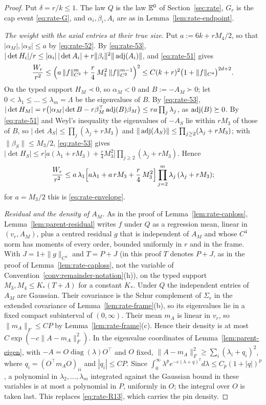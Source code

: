 \begin{proof}
Put $\delta=r/k\le1$. The law $Q$ is the law $\mathbb E^0$ of Section~\ref{sec:rate}, $G_r$ is the cap event \eqref{eq:rate-G}, and $\alpha_i,\beta_i,A_i$ are as in Lemma~\ref{lem:rate-endpoint}.

\emph{The weight with the axial entries at their true size.} Put $a:=6k+rM_4/2$, so that $|\alpha_M|,|\alpha_S|\le a$ by \eqref{eq:rate-52}. By \eqref{eq:rate-53}, $|\det H_i|/r\le|\alpha_i|\,|\det A_i|+r\|\beta_i\|^2\|\operatorname{adj}(A_i)\|$, and \eqref{eq:rate-51} gives
\begin{equation}\label{eq:remainder-capW}
\frac{W_r}{r^2}\le\Bigl(a\,\|f\|_{C^2}^m+\frac r4\,M_3^2\,\|f\|_{C^2}^{m-1}\Bigr)^2\le C(k+r)^2\bigl(1+\|f\|_{C^4}\bigr)^{2d+2}.
\end{equation}
On the typed support $H_M\prec0$, so $\alpha_M<0$ and $B:=-A_M\succ0$; let $0<\lambda_1\le\dots\le\lambda_m=\Lambda$ be the eigenvalues of $B$. By \eqref{eq:rate-53}, $|\det H_M|=r\bigl(|\alpha_M|\det B-r\beta_M^{\top}\operatorname{adj}(B)\beta_M\bigr)\le ra\prod_j\lambda_j$, as $\operatorname{adj}(B)\succeq0$. By \eqref{eq:rate-51} and Weyl's inequality the eigenvalues of $-A_S$ lie within $rM_3$ of those of $B$, so $|\det A_S|\le\prod_j(\lambda_j+rM_3)$ and $\|\operatorname{adj}(A_S)\|\le\prod_{j\ge2}(\lambda_j+rM_3)$; with $\|\beta_S\|\le M_3/2$, \eqref{eq:rate-53} gives $|\det H_S|\le r\bigl[a(\lambda_1+rM_3)+\frac r4M_3^2\bigr]\prod_{j\ge2}(\lambda_j+rM_3)$. Hence
\begin{equation}\label{eq:remainder-capenv}
\frac{W_r}{r^2}\le a\,\lambda_1\Bigl[a\lambda_1+a\,rM_3+\frac r4\,M_3^2\Bigr]\prod_{j=2}^m\lambda_j\,(\lambda_j+rM_3);
\end{equation}
for $a=M_3/2$ this is \eqref{eq:rate-envelope}.

\emph{Residual and the density of $A_M$.} As in the proof of Lemma~\ref{lem:rate-caploss}, Lemma~\ref{lem:parent-residual} writes $f$ under $Q$ as a regression mean, linear in $(v_r,A_M)$, plus a centred residual $g$ that is independent of $A_M$ and whose $C^4$ norm has moments of every order, bounded uniformly in $r$ and in the frame. With $J=1+\|g\|_{C^4}$ and $T=P+J$ (in this proof $T$ denotes $P+J$, as in the proof of Lemma~\ref{lem:rate-caploss}, not the variable of Convention~\ref{conv:remainder-notation}(h)), on the typed support $M_3,M_4\le K_*(T+\Lambda)$ for a constant $K_*$. Under $Q$ the independent entries of $A_M$ are Gaussian. Their covariance is the Schur complement of $\Sigma_r$ in the extended covariance of Lemma~\ref{lem:rate-frame}(b), so its eigenvalues lie in a fixed compact subinterval of $(0,\infty)$. Their mean $m_A$ is linear in $v_r$, so $\|m_A\|_F\le CP$ by Lemma~\ref{lem:rate-frame}(c). Hence their density is at most $C\exp(-c\|A-m_A\|_F^2)$. In the eigenvalue coordinates of Lemma~\ref{lem:parent-eigen}, with $-A=O\operatorname{diag}(\lambda)O^{\top}$ and $O$ fixed, $\|A-m_A\|_F^2\ge\sum_i(\lambda_i+q_i)^2$, where $q_i=(O^{\top}m_AO)_{ii}$ and $|q_i|\le CP$. Since $\int_0^\infty\lambda^pe^{-c(\lambda+q)^2}d\lambda\le C_p(1+|q|)^p$, a polynomial in $\lambda_2,\dots,\lambda_m$ integrated against the Gaussian bound in these variables is at most a polynomial in $P$, uniformly in $O$; the integral over $O$ is taken last. This replaces \eqref{eq:rate-R13}, which carries the pin density.


\end{proof}
